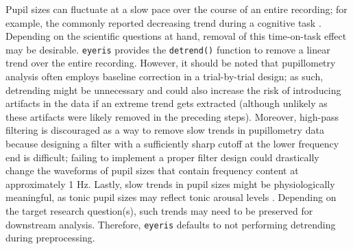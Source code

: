 Pupil sizes can fluctuate at a slow pace over the course of an entire recording; for example, the commonly reported decreasing trend during a cognitive task \parencite[a.k.a., the ``time-on-task effect'';][]{beatty1982phasic,hopstaken2015multifaceted,martin2022pupillometry,massar2016rewards,steinhauer2022publication,unsworth2016pupillary,zhao2019pupillometry}. Depending on the scientific questions at hand, removal of this time-on-task effect may be desirable. \texttt{eyeris} provides the \texttt{detrend()} function to remove a linear trend over the entire recording. However, it should be noted that pupillometry analysis often employs baseline correction in a trial-by-trial design; as such, detrending might be unnecessary and could also increase the risk of introducing artifacts in the data if an extreme trend gets extracted (although unlikely as these artifacts were likely removed in the preceding steps). Moreover, high-pass filtering is discouraged as a way to remove slow trends in pupillometry data because designing a filter with a sufficiently sharp cutoff at the lower frequency end is difficult; failing to implement a proper filter design could drastically change the waveforms of pupil sizes that contain frequency content at approximately 1 Hz. Lastly, slow trends in pupil sizes might be physiologically meaningful, as tonic pupil sizes may reflect tonic arousal levels \parencite{astonjones2005integrative,groot2021probing,joshi2020pupil,madore2020memory,madore2022readiness,murphy2011pupillometry,schwartz2025attending,smallwood2012insulation,tsukahara2016relationship,unsworth2018tracking}. Depending on the target research question(s), such trends may need to be preserved for downstream analysis. Therefore, \texttt{eyeris} defaults to not performing detrending during preprocessing.

